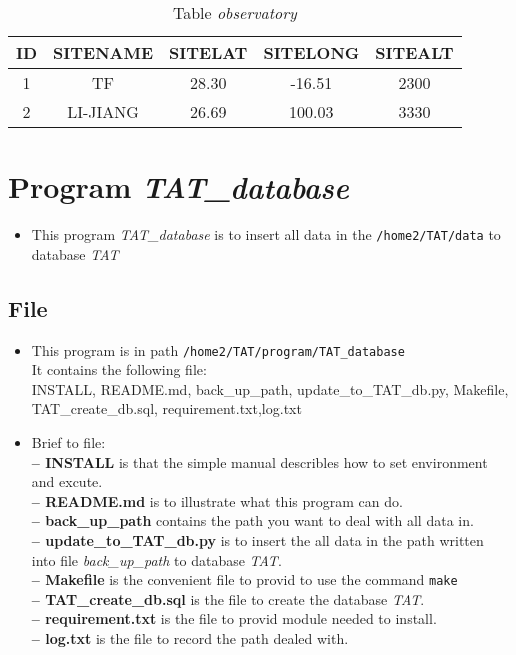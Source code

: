 \documentclass[12pt]{article}    %
\begin{document}
	\begin{table}[!htbp]
		\centering
		\caption{Table {\it observatory}}
		\begin{tabular}{|*{5}{c|}}
			\hline
			ID & SITENAME & SITELAT & SITELONG & SITEALT \\ \hline
			1 & TF & 28.30 & -16.51 & 2300 \\ \hline    
			2 & LI-JIANG & 26.69 & 100.03 & 3330 \\ \hline 
		\end{tabular}
	\end{table}

	\newpage
	
	\section{Program {\it TAT\_database}}
	\begin{itemize}
		\item This program {\it TAT\_database} is to insert all data in the \verb|/home2/TAT/data| to database {\it TAT}
	\end{itemize}
	
	
	\subsection{File}
	
	\begin{itemize}
		\item This program is in path \verb|/home2/TAT/program/TAT_database|\\
		It contains the following file:\\
		\indent INSTALL, README.md, back\_up\_path, update\_to\_TAT\_db.py, Makefile, TAT\_create\_db.sql, requirement.txt,log.txt
		\item Brief to file:\\
		\textbf {-- INSTALL} is that the simple manual describles how to set	environment and excute.\\
		\textbf {-- README.md} is to illustrate what this program can do.\\
		\textbf {-- back\_up\_path} contains the path you want to deal with all data in.\\
		\textbf {-- update\_to\_TAT\_db.py} is to insert the all data in the path written into file {\it back\_up\_path} to database {\it TAT}.\\
		\textbf {-- Makefile} is the convenient file to provid to use the command \verb|make| \\
		\textbf {-- TAT\_create\_db.sql} is the file to create the database {\it TAT}.\\
		\textbf {-- requirement.txt} is the file to provid module needed to install.\\
		\textbf {-- log.txt} is the file to record the path dealed with.
	\end{itemize}
\end{document}
